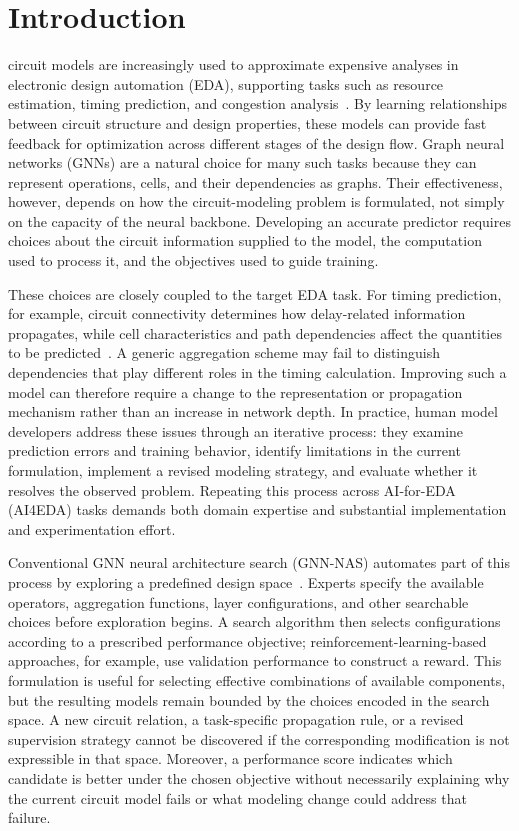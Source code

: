 \section{Introduction}
\label{introduction}

 circuit models are increasingly used to approximate expensive analyses in electronic design automation (EDA), supporting tasks such as resource estimation, timing prediction, and congestion analysis~\cite{lopera2021survey}. By learning relationships between circuit structure and design properties, these models can provide fast feedback for optimization across different stages of the design flow. Graph neural networks (GNNs) are a natural choice for many such tasks because they can represent operations, cells, and their dependencies as graphs. Their effectiveness, however, depends on how the circuit-modeling problem is formulated, not simply on the capacity of the neural backbone. Developing an accurate predictor requires choices about the circuit information supplied to the model, the computation used to process it, and the objectives used to guide training.

These choices are closely coupled to the target EDA task. For timing prediction, for example, circuit connectivity determines how delay-related information propagates, while cell characteristics and path dependencies affect the quantities to be predicted~\cite{guo2022timing}. A generic aggregation scheme may fail to distinguish dependencies that play different roles in the timing calculation. Improving such a model can therefore require a change to the representation or propagation mechanism rather than an increase in network depth. In practice, human model developers address these issues through an iterative process: they examine prediction errors and training behavior, identify limitations in the current formulation, implement a revised modeling strategy, and evaluate whether it resolves the observed problem. Repeating this process across AI-for-EDA (AI4EDA) tasks demands both domain expertise and substantial implementation and experimentation effort.

Conventional GNN neural architecture search (GNN-NAS) automates part of this process by exploring a predefined design space~\cite{gao2019graphnas,zhou2022auto}. Experts specify the available operators, aggregation functions, layer configurations, and other searchable choices before exploration begins. A search algorithm then selects configurations according to a prescribed performance objective; reinforcement-learning-based approaches, for example, use validation performance to construct a reward. This formulation is useful for selecting effective combinations of available components, but the resulting models remain bounded by the choices encoded in the search space. A new circuit relation, a task-specific propagation rule, or a revised supervision strategy cannot be discovered if the corresponding modification is not expressible in that space. Moreover, a performance score indicates which candidate is better under the chosen objective without necessarily explaining why the current circuit model fails or what modeling change could address that failure.

